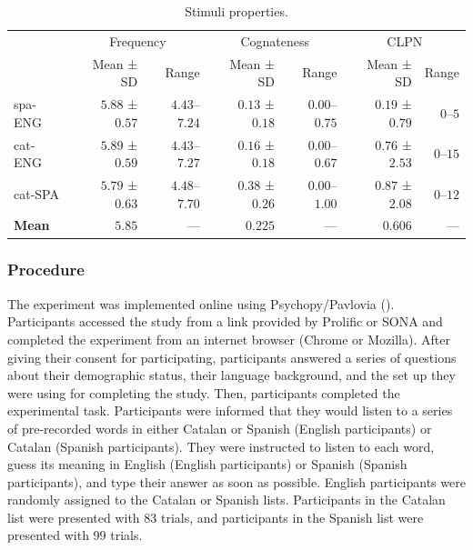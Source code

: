 \documentclass[
]{article}
\begin{document}
\begin{longtable}{l|rrrrrr}

\caption{\label{tbl-stimuli}Stimuli properties.}

\tabularnewline

\toprule
\multicolumn{1}{l}{} & \multicolumn{2}{c}{Frequency} & \multicolumn{2}{c}{Cognateness} & \multicolumn{2}{c}{CLPN} \\ 
\cmidrule(lr){2-3} \cmidrule(lr){4-5} \cmidrule(lr){6-7}
\multicolumn{1}{l}{} & Mean ± SD & Range & Mean ± SD & Range & Mean ± SD & Range \\ 
\midrule\addlinespace[2.5pt]
spa-ENG & $5.88$ ± $0.57$ & $4.43$–$7.24$ & $0.13$ ± $0.18$ & $0.00$–$0.75$ & $0.19$ ± $0.79$ & $0$–$5$ \\ 
cat-ENG & $5.89$ ± $0.59$ & $4.43$–$7.27$ & $0.16$ ± $0.18$ & $0.00$–$0.67$ & $0.76$ ± $2.53$ & $0$–$15$ \\ 
cat-SPA & $5.79$ ± $0.63$ & $4.48$–$7.70$ & $0.38$ ± $0.26$ & $0.00$–$1.00$ & $0.87$ ± $2.08$ & $0$–$12$ \\ 
\midrule 
\midrule 
\textbf{Mean} & $5.85$ & — & $0.225$ & — & $0.606$ & — \\ 
\bottomrule

\end{longtable}

\subsubsection{Procedure}\label{procedure}

The experiment was implemented online using Psychopy/Pavlovia
(). Participants
accessed the study from a link provided by Prolific or SONA and
completed the experiment from an internet browser (Chrome or Mozilla).
After giving their consent for participating, participants answered a
series of questions about their demographic status, their language
background, and the set up they were using for completing the study.
Then, participants completed the experimental task. Participants were
informed that they would listen to a series of pre-recorded words in
either Catalan or Spanish (English participants) or Catalan (Spanish
participants). They were instructed to listen to each word, guess its
meaning in English (English participants) or Spanish (Spanish
participants), and type their answer as soon as possible. English
participants were randomly assigned to the Catalan or Spanish lists.
Participants in the Catalan list were presented with 83 trials, and
participants in the Spanish list were presented with 99 trials.
\end{document}
